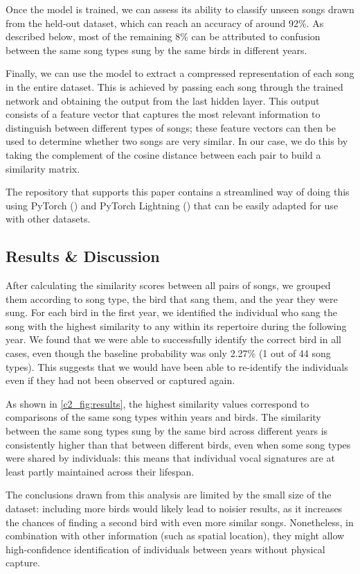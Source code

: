 Once the model is trained, we can assess its ability to classify unseen songs drawn from the held-out dataset, which can reach an accuracy of around 92\%. As described below, most of the remaining 8\% can be attributed to confusion between the same song types sung by the same birds in different years. 

Finally, we can use the model to extract a compressed representation of each song in the entire dataset. This is achieved by passing each song through the trained network and obtaining the output from the last hidden layer. This output consists of a feature vector that captures the most relevant information to distinguish between different types of songs; these feature vectors can then be used to determine whether two songs are very similar. In our case, we do this by taking the complement of the cosine distance between each pair to build a similarity matrix.

The repository that supports this paper contains a streamlined way of doing this using PyTorch (\citeyear{pytorch2019}) and PyTorch Lightning (\citeyear{pytorchlightning2019}) that can be easily adapted for use with other datasets.


\subsection{Results \& Discussion}

After calculating the similarity scores between all pairs of songs, we grouped them according to song type, the bird that sang them, and the year they were sung. For each bird in the first year, we identified the individual who sang the song with the highest similarity to any within its repertoire during the following year. We found that we were able to successfully identify the correct bird in all cases, even though the baseline probability was only 2.27\% (1 out of 44 song types). This suggests that we would have been able to re-identify the individuals even if they had not been observed or captured again.

As shown in \autoref{c2_fig:results}, the highest similarity values correspond to comparisons of the same song types within years and birds. The similarity between the same song types sung by the same bird across different years is consistently higher than that between different birds, even when some song types were shared by individuals: this means that individual vocal signatures are at least partly maintained across their lifespan.

The conclusions drawn from this analysis are limited by the small size of the dataset: including more birds would likely lead to noisier results, as it increases the chances of finding a second bird with even more similar songs. Nonetheless, in combination with other information (such as spatial location), they might allow high-confidence identification of individuals between years without physical capture.

